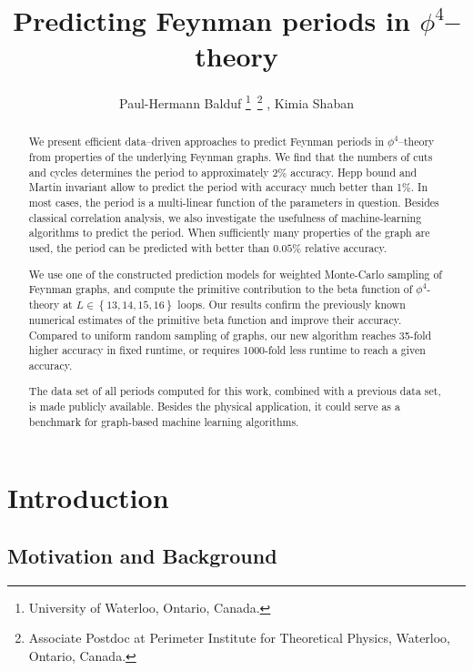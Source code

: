 \documentclass[11pt]{scrartcl}
\title{Predicting Feynman periods in $\phi^4$--theory}
\author{Paul-Hermann Balduf \footnote{University of Waterloo, Ontario, Canada.}~\footnote{Associate Postdoc at Perimeter Institute for Theoretical Physics, Waterloo, Ontario, Canada.} , Kimia Shaban\footnotemark[1]}
\numberwithin{equation}{section}
\begin{document}
\maketitle 


\begin{abstract}
	 
	
	We present efficient data--driven approaches to predict Feynman periods in $\phi^4$--theory from properties of the underlying Feynman graphs. We find that the numbers of cuts and cycles determines the period to approximately 2\% accuracy. Hepp bound and Martin invariant allow to predict the period with accuracy much better than 1\%. In most cases, the period is a multi-linear function of the parameters in question. Besides classical correlation analysis, we also investigate the usefulness of machine-learning algorithms to predict the period. When sufficiently many properties of the graph are used, the period can be predicted with better than $0.05\%$ relative accuracy. 
	
	We use one of the constructed prediction models for   weighted Monte-Carlo sampling of Feynman graphs, and compute the primitive contribution to the beta function of $\phi^4$-theory at $L\in \left \lbrace 13, 14, 15, 16 \right \rbrace $ loops. Our results confirm the previously known numerical estimates of the primitive beta function and improve their accuracy. Compared to uniform random sampling of graphs, our new algorithm reaches 35-fold higher accuracy in fixed runtime, or requires 1000-fold less runtime to reach a given accuracy. 
	
	The data set of all periods computed for this work, combined with a previous data set, is made publicly available. Besides the physical application, it could serve as a benchmark for graph-based machine learning algorithms.
\end{abstract}


\newpage

\tableofcontents


\newpage 


\section{Introduction}\label{sec:introduction}

\subsection{Motivation and Background}\label{sec:motivation}
\end{document}
